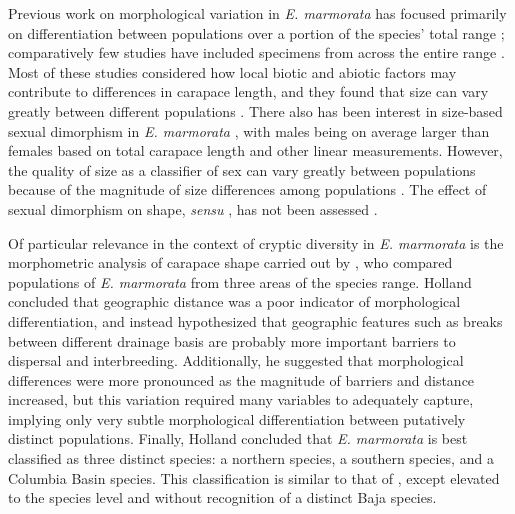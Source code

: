 \documentclass[12pt,letterpaper]{article}
\begin{document}
Previous work on morphological variation in \textit{E. marmorata} has focused primarily on differentiation between populations over a portion of the species' total range \citep{Lubcke2007,Germano2008,Germano2009,Bury2010}; comparatively few studies have included specimens from across the entire range \citep{Holland1992}. Most of these studies considered how local biotic and abiotic factors may contribute to differences in carapace length, and they found that size can vary greatly between different populations \citep{Lubcke2007,Germano2008,Germano2009}. There also has been interest in size-based sexual dimorphism in \textit{E. marmorata} \citep{Holland1992,Lubcke2007,Germano2009}, with males being on average larger than females based on total carapace length and other linear measurements. However, the quality of size as a classifier of sex can vary greatly between populations \citep{Holland1992} because of the magnitude of size differences among populations \citep{Lubcke2007,Germano2009}. The effect of sexual dimorphism on shape, \textit{sensu} \citet{Kendall1977a}, has not been assessed \citep{Holland1992,Lubcke2007,Germano2008}.

Of particular relevance in the context of cryptic diversity in \textit{E. marmorata} is the morphometric analysis of carapace shape carried out by \citet{Holland1992}, who compared populations of \textit{E. marmorata} from three areas of the species range. Holland concluded that geographic distance was a poor indicator of morphological differentiation, and instead hypothesized that geographic features such as breaks between different drainage basis are probably more important barriers to dispersal and interbreeding. Additionally, he suggested that morphological differences were more pronounced as the magnitude of barriers and distance increased, but this variation required many variables to adequately capture, implying only very subtle morphological differentiation between putatively distinct populations. Finally, Holland concluded that \textit{E. marmorata} is best classified as three distinct species: a northern species, a southern species, and a Columbia Basin species. This classification is similar to that of \citet{Seeliger1945}, except elevated to the species level and without recognition of a distinct Baja species. 
\end{document}
